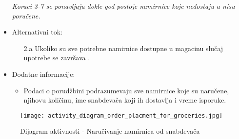 \begin{itemize}
\begin{enumerate}
            
		\end{enumerate}
		\textit{Koraci 3-7 se ponavljaju dokle god postoje namirnice koje nedostaju a nisu poručene.}
	\item Alternativni tok:
		\begin{itemize}
		    \item[2.a] Ukoliko su sve potrebne namirnice dostupne u magacinu slučaj upotrebe se završava .
		 
		\end{itemize}
   \item Dodatne informacije:
		\begin{itemize}
		    \item Podaci o porudžbini podrazumevaju sve namirnice koje su naručene, njihovu količinu, ime snabdevača koji ih dostavlja i vreme isporuke.
	
		\end{itemize}
\end{itemize}

\begin{figure}[H]
\begin{center}
\texttt{[image: activity\_diagram\_order\_placment\_for\_groceries.jpg]}
\end{center}
    \caption{Dijagram aktivnosti - Naručivanje namirnica od snabdevača}
\label{fig:Activity_diagram_order_placment_for_groceries}
\end{figure}
